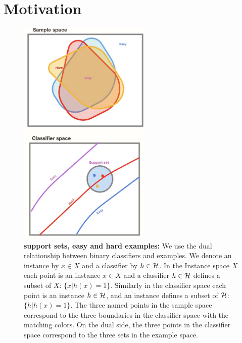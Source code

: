 \documentclass{article}
\begin{document}
\newcommand{\err}{\varepsilon}
\newcommand{\emperr}{\hat{\varepsilon}}
\newcommand{\lempir}{\hat{\ell}}
\newcommand{\ltrue}{\ell}
\newcommand{\pempir}{\hat{p}}
\newcommand{\ptrue}{p}
\newcommand{\lideal}{\ell}
\newcommand{\weight}{w}

\newcommand{\sign}{\mbox{\rm sign}}

\section{Motivation}
\label{sec:Motivation}

\begin{figure}[h]
\begin{center}
\includegraphics[width=2.5in]{figures/SupportSet.jpg}
\end{center}
\caption{{\bf support sets, easy and hard examples:} We use the dual
  relationship between binary classifiers and examples. We denote
  an instance by $x \in X$ and a classifier by $h \in {\cal H}$. In the
  Instance space $X$ each point is an instance $x \in X$ and a
  classifier $h \in {\cal H}$ defines a subset of $X$: $\{x |
  h(x)=1\}$. Similarly in the classifier space each point is an
  instance $h \in {\cal H}$, and an instance defines a subset of ${\cal H}$:
  $\{h | h(x)=1\}$. The three named points in the sample space
  correspond to
  the three boundaries in the classifier space with the matching
  colors. On the dual side, the three points in the classifier space
  correspond to the three sets in the example space.
\label{fig:duality}}
\end{figure}
\end{document}

